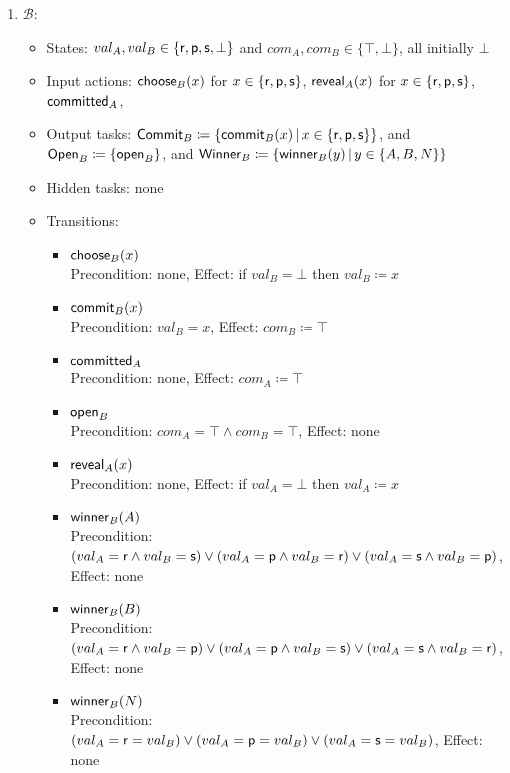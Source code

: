 \documentclass[10pt]{article}
\begin{document}
\begin{example}[$\RPSIdeal$]
\begin{enumerate}
\item $\mathcal{B}$:
\begin{itemize}
\item States: $val_A, val_B \in \{\mathsf{r},\mathsf{p},\mathsf{s},\bot\}$ and $com_A, com_B \in \{\top,\bot\}$, all initially $\bot$
\item Input actions: $\mathsf{choose}_B(x)$ for $x \in \{\mathsf{r},\mathsf{p},\mathsf{s}\}$, $\mathsf{reveal}_A(x)$ for $x \in \{\mathsf{r},\mathsf{p},\mathsf{s}\}$, $\mathsf{committed}_A$, 
\item Output tasks: $\mathsf{Commit}_B \coloneqq \{\mathsf{commit}_B(x) \, | \, x \in \{\mathsf{r},\mathsf{p},\mathsf{s}\}\}$, and $\mathsf{Open}_B \coloneqq \{\mathsf{open}_B\}$, and $\mathsf{Winner}_B \coloneqq \{\mathsf{winner}_B(y) \, | \, y \in \{A,B,N\}\}$ 
\item Hidden tasks: none
\item Transitions:
\begin{itemize}
\item $\mathsf{choose}_B(x)$ \\
Precondition: none, Effect: if $val_B = \bot$ then $val_B \coloneqq x$
\item $\mathsf{commit}_B(x)$ \\
Precondition: $val_B = x$, Effect: $com_B \coloneqq \top$
\item $\mathsf{committed}_A$ \\
Precondition: none, Effect: $com_A \coloneqq \top$
\item $\mathsf{open}_B$\\
Precondition: $com_A = \top \wedge com_B = \top$, Effect: none
\item $\mathsf{reveal}_A(x)$\\
Precondition: none, Effect: if $val_A = \bot$ then $val_A \coloneqq x$
\item $\mathsf{winner}_B(A)$ \\
Precondition: $(val_A = \mathsf{r} \wedge val_B = \mathsf{s}) \vee (val_A = \mathsf{p} \wedge val_B = \mathsf{r}) \vee (val_A = \mathsf{s} \wedge val_B = \mathsf{p})$, Effect: none
\item $\mathsf{winner}_B(B)$ \\
Precondition: $(val_A = \mathsf{r} \wedge val_B = \mathsf{p}) \vee (val_A = \mathsf{p} \wedge val_B = \mathsf{s}) \vee (val_A = \mathsf{s} \wedge val_B = \mathsf{r})$, Effect: none
\item $\mathsf{winner}_B(N)$ \\
Precondition: $(val_A = \mathsf{r} = val_B) \vee (val_A = \mathsf{p} = val_B) \vee (val_A = \mathsf{s} = val_B)$, Effect: none
\end{itemize}
\end{itemize}


\end{enumerate}
\end{example}
\end{document}
